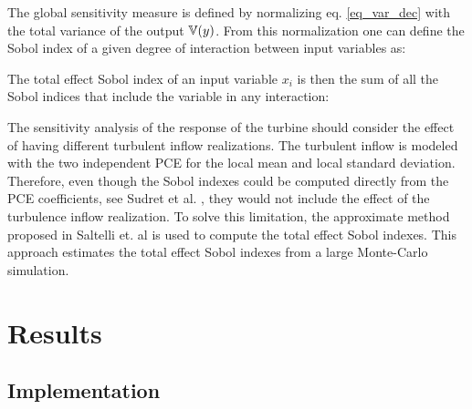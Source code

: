 \documentclass[preprint,12pt]{elsarticle}
\begin{document}
The global sensitivity measure is defined by normalizing eq. \ref{eq_var_dec} with the total variance of the output $\mathbb{V}(y)$. From this normalization one can define the Sobol index of a given degree of interaction between input variables as:


The total effect Sobol index of an input variable $x_i$ is then the sum of all the Sobol indices that include the variable in any interaction:


The sensitivity analysis of the response of the turbine should consider the effect of having different turbulent inflow realizations. The turbulent inflow is modeled with the two independent PCE for the local mean and local standard deviation. Therefore, even though the Sobol indexes could be computed directly from the PCE coefficients, see Sudret et al. \cite{sudret2008global}, they would not include the effect of the turbulence inflow realization. To solve this limitation, the approximate method proposed in Saltelli et. al \cite{saltelli2010variance} is used to compute the total effect Sobol indexes. This approach estimates the total effect Sobol indexes from a large Monte-Carlo simulation.



\section{Results}
\label{sec_Results}

\subsection{Implementation}
\end{document}
